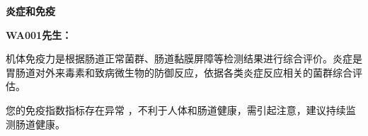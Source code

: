 

\usepackage{graphicx}
\graphicspath{{cores/}}



\setlength{\arrayrulewidth}{0.5pt}
\fontsize{9.3pt}{17pt}\selectfont
\color{gray2}

\vspace*{0mm}
\begin{center}
{\bf\sanhao 炎症和免疫}
\end{center}

\medskip

\noindent
{\bf\xiaosihao WA001先生：}

\bigskip

机体免疫力是根据肠道正常菌群、肠道黏膜屏障等检测结果进行综合评价。炎症是胃肠道对外来毒素和致病微生物的防御反应，依据各类炎症反应相关的菌群综合评估。

您的免疫指数指标存在异常
，不利于人体和肠道健康，需引起注意，建议持续监测肠道健康。

